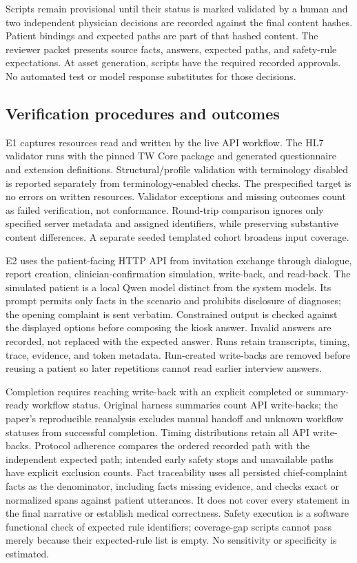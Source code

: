 Scripts remain provisional until their status is marked validated by a human and
two independent physician decisions are recorded against the final content hashes.
Patient bindings and expected paths are part of that hashed content.
The reviewer packet presents source facts,
answers, expected paths, and safety-rule expectations. At asset generation,
\ValidatedScriptCount{} scripts have the required recorded approvals. No automated
test or model response substitutes for those decisions.

\subsection{Verification procedures and outcomes}
E1 captures resources read and written by the live API workflow. The HL7 validator
runs with the pinned TW Core package and generated questionnaire and extension
definitions. Structural/profile validation with terminology disabled is reported
separately from terminology-enabled checks. The prespecified target is no errors
on written resources. Validator exceptions and missing outcomes count as failed
verification, not conformance. Round-trip comparison ignores only specified
server metadata and assigned identifiers, while preserving substantive content
differences. A separate seeded templated cohort broadens input coverage.

E2 uses the patient-facing HTTP API from invitation exchange through dialogue,
report creation, clinician-confirmation simulation, write-back, and read-back.
The simulated patient is a local Qwen model distinct from the system models. Its
prompt permits only facts in the scenario and prohibits disclosure of diagnoses;
the opening complaint is sent verbatim. Constrained output is checked against
the displayed options before composing the kiosk answer. Invalid answers are
recorded, not replaced with the expected answer. Runs retain transcripts, timing,
trace, evidence, and token metadata. Run-created write-backs are removed before
reusing a patient so later repetitions cannot read earlier interview answers.

Completion requires reaching write-back with an explicit completed or
summary-ready workflow status. Original harness summaries count API write-backs;
the paper's reproducible reanalysis excludes manual handoff and unknown workflow
statuses from successful completion. Timing distributions retain all API
write-backs. Protocol adherence compares the ordered recorded path with the independent
expected path; intended early safety stops and unavailable paths have explicit
exclusion counts. Fact traceability uses all persisted chief-complaint facts as
the denominator, including facts missing evidence, and checks exact or normalized
spans against patient utterances. It does not cover every statement in the final
narrative or establish medical correctness.
Safety execution is a software functional check of expected rule identifiers;
coverage-gap scripts cannot pass merely because their expected-rule list is empty.
No sensitivity or specificity is estimated.

